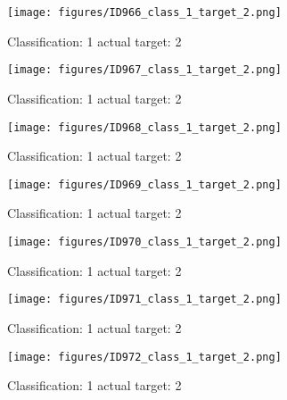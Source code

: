 \begin{figure}[h!]
\begin{center}
\texttt{[image: figures/ID966\_class\_1\_target\_2.png]}
\end{center}
\caption{ Classification: 1 actual target: 2}
\label{fig:ID966_class_1_target_2}
\end{figure}
\begin{figure}[h!]
\begin{center}
\texttt{[image: figures/ID967\_class\_1\_target\_2.png]}
\end{center}
\caption{ Classification: 1 actual target: 2}
\label{fig:ID967_class_1_target_2}
\end{figure}
\begin{figure}[h!]
\begin{center}
\texttt{[image: figures/ID968\_class\_1\_target\_2.png]}
\end{center}
\caption{ Classification: 1 actual target: 2}
\label{fig:ID968_class_1_target_2}
\end{figure}
\begin{figure}[h!]
\begin{center}
\texttt{[image: figures/ID969\_class\_1\_target\_2.png]}
\end{center}
\caption{ Classification: 1 actual target: 2}
\label{fig:ID969_class_1_target_2}
\end{figure}
\begin{figure}[h!]
\begin{center}
\texttt{[image: figures/ID970\_class\_1\_target\_2.png]}
\end{center}
\caption{ Classification: 1 actual target: 2}
\label{fig:ID970_class_1_target_2}
\end{figure}
\begin{figure}[h!]
\begin{center}
\texttt{[image: figures/ID971\_class\_1\_target\_2.png]}
\end{center}
\caption{ Classification: 1 actual target: 2}
\label{fig:ID971_class_1_target_2}
\end{figure}
\begin{figure}[h!]
\begin{center}
\texttt{[image: figures/ID972\_class\_1\_target\_2.png]}
\end{center}
\caption{ Classification: 1 actual target: 2}
\label{fig:ID972_class_1_target_2}
\end{figure}
